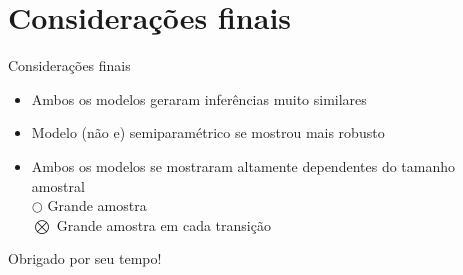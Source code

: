 \section{Considerações finais}\label{consideracoes-finais}

\begin{frame}

\begin{block}{Considerações finais}
 \begin{itemize}
  \pause \item Ambos os modelos geraram inferências muito similares
  \vspace{.2cm}
  \pause \item Modelo (não e) semiparamétrico se mostrou mais robusto
  \vspace{.2cm}
  \pause \item Ambos os modelos se mostraram altamente dependentes do
               tamanho amostral \\
  \vspace{.3cm}
  \pause \hskip 1cm \(\bigcirc\) Grande amostra \vspace{.5cm} \\
         \hskip 1cm \(\bigotimes\) Grande amostra em cada transição
 \end{itemize}
\end{block}

\end{frame}

\begin{frame}

\LARGE \centering Obrigado por seu tempo!

\end{frame}
